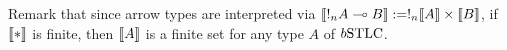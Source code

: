 Remark that since arrow types are interpreted via $\llbracket!_{n}A\multimap B\rrbracket:= !_{n}\llbracket A\rrbracket \times \llbracket B\rrbracket$, 
if $\llbracket*\rrbracket$ is finite, then $\llbracket A\rrbracket$ is a finite set for any type $A$ of $\BSTLC$.


\begin{comment}

\begin{figure*}

	\scriptsize
	
	\[ \arraycolsep=5pt\def\arraystretch{2.8}
	\begin{array}{cccc}
		\prooftree
		\Gamma \vdash M:A
		\justifies
		\Gamma, x:_{0}B \vdash M:A
		\endprooftree 
		&
		\prooftree
		\Gamma, x:_{n}B, y:_{m} B\vdash M:A
		\justifies
		\Gamma, x:_{n+m}B\vdash M\{x/y\}:A
		\endprooftree 
		&
		\prooftree
		\Gamma, x:_{n} A\vdash M: B
		\justifies
		\Gamma\vdash \lambda x.M: !_{n}A\multimap B
		\endprooftree
		&
		\prooftree
		\Gamma \vdash M: !_nA\multimap B
		\quad
		\Delta\vdash N: A
		\justifies
		\Gamma +n\Delta\vdash MN: B
		\endprooftree
		\\
		\\
		\hline
		\\
		\prooftree
		\Gamma, x: A\vdash M: B
		\justifies
		\Gamma\vdash \lambda x.M: A\to B
		\endprooftree 
		&
		\prooftree
		\Gamma \vdash M: A\to B
		\quad
		\Gamma\vdash \mathbb T: A
		\justifies
		\Gamma \vdash M\mathbb T: B
		\endprooftree 
		&
		\prooftree
		\Gamma \vdash M: A\to B
		\quad
		\Gamma \vdash N: A
		\justifies
		\Gamma \vdash \Diff{M}{N}: A\to B
		\endprooftree
		&
		\prooftree
		\Gamma\vdash M_1: A
		\,\cdots\,
		\Gamma \vdash M_n:A
		\justifies
		\Gamma \vdash M_1+\cdots +M_n : A
		\using (n\geq 2)
		\endprooftree
	\end{array}
	\]
	\caption{Typing rules (axiom rules are given in the text) for $\BSTLC$ (top) and $\STDLC$ (bottom).}\label{fig:rules}
\end{figure*}

\end{comment}

